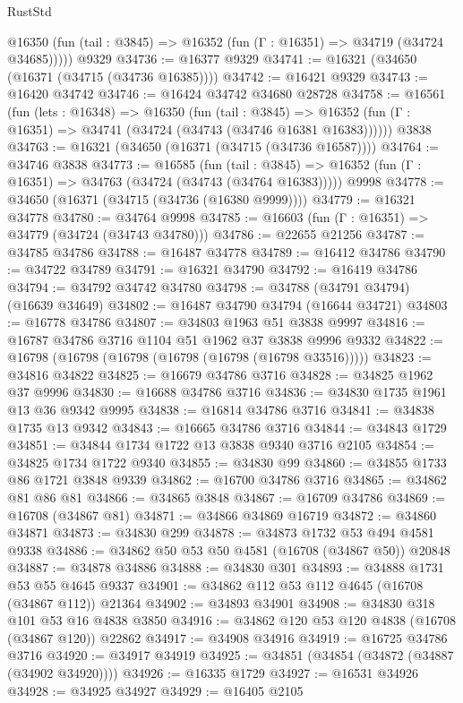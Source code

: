 \begin{lexlean}{RustStd}
\begin{coremodule}
      @16350 (fun (tail : @3845) => @16352 (fun (Γ : @16351) => @34719 (@34724 @34685)))))
    @9329
@34736 := @16377 @9329
@34741 := @16321 (@34650 (@16371 (@34715 (@34736 @16385))))
@34742 := @16421 @9329
@34743 := @16420 @34742
@34746 := @16424 @34742 @34680 @28728
@34758 := @16561
    (fun (lets : @16348) =>
    @16350
      (fun (tail : @3845) =>
      @16352 (fun (Γ : @16351) => @34741 (@34724 (@34743 (@34746 @16381 @16383))))))
    @3838
@34763 := @16321 (@34650 (@16371 (@34715 (@34736 @16587))))
@34764 := @34746 @3838
@34773 := @16585
    (fun (tail : @3845) => @16352 (fun (Γ : @16351) => @34763 (@34724 (@34743 (@34764 @16383)))))
    @9998
@34778 := @34650 (@16371 (@34715 (@34736 (@16380 @9999))))
@34779 := @16321 @34778
@34780 := @34764 @9998
@34785 := @16603 (fun (Γ : @16351) => @34779 (@34724 (@34743 @34780)))
@34786 := @22655 @21256
@34787 := @34785 @34786
@34788 := @16487 @34778
@34789 := @16412 @34786
@34790 := @34722 @34789
@34791 := @16321 @34790
@34792 := @16419 @34786
@34794 := @34792 @34742 @34780
@34798 := @34788 (@34791 @34794) (@16639 @34649)
@34802 := @16487 @34790 @34794 (@16644 @34721)
@34803 := @16778 @34786
@34807 := @34803 @1963 @51 @3838 @9997
@34816 := @16787 @34786 @3716 @1104 @51 @1962 @37 @3838 @9996 @9332
@34822 := @16798 (@16798 (@16798 (@16798 (@16798 (@16798 @33516)))))
@34823 := @34816 @34822
@34825 := @16679 @34786 @3716
@34828 := @34825 @1962 @37 @9996
@34830 := @16688 @34786 @3716
@34836 := @34830 @1735 @1961 @13 @36 @9342 @9995
@34838 := @16814 @34786 @3716
@34841 := @34838 @1735 @13 @9342
@34843 := @16665 @34786 @3716
@34844 := @34843 @1729
@34851 := @34844 @1734 @1722 @13 @3838 @9340 @3716 @2105
@34854 := @34825 @1734 @1722 @9340
@34855 := @34830 @99
@34860 := @34855 @1733 @86 @1721 @3848 @9339
@34862 := @16700 @34786 @3716
@34865 := @34862 @81 @86 @81
@34866 := @34865 @3848
@34867 := @16709 @34786
@34869 := @16708 (@34867 @81)
@34871 := @34866 @34869 @16719
@34872 := @34860 @34871
@34873 := @34830 @299
@34878 := @34873 @1732 @53 @494 @4581 @9338
@34886 := @34862 @50 @53 @50 @4581 (@16708 (@34867 @50)) @20848
@34887 := @34878 @34886
@34888 := @34830 @301
@34893 := @34888 @1731 @53 @55 @4645 @9337
@34901 := @34862 @112 @53 @112 @4645 (@16708 (@34867 @112)) @21364
@34902 := @34893 @34901
@34908 := @34830 @318 @101 @53 @16 @4838 @3850
@34916 := @34862 @120 @53 @120 @4838 (@16708 (@34867 @120)) @22862
@34917 := @34908 @34916
@34919 := @16725 @34786 @3716
@34920 := @34917 @34919
@34925 := @34851 (@34854 (@34872 (@34887 (@34902 @34920))))
@34926 := @16335 @1729
@34927 := @16531 @34926
@34928 := @34925 @34927
@34929 := @16405 @2105

\end{coremodule}
\end{lexlean}
